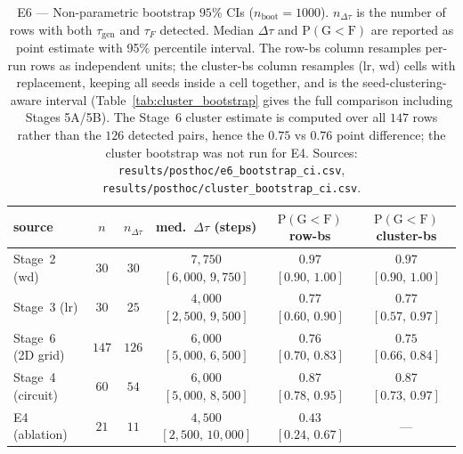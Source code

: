 \documentclass{article}
\newcommand{\taug}{\tau_{\mathrm{gen}}}
\newcommand{\tauf}{\tau_{F}}
\newcommand{\Dtau}{\Delta\tau}
\begin{document}
\begin{table}[tbp]
  \centering
  \caption{E6 --- Non-parametric bootstrap $95\%$ CIs
    ($n_{\mathrm{boot}}{=}1000$).
    $n_{\Dtau}$ is the number of rows with both $\taug$ and
    $\tauf$ detected.
    Median $\Dtau$ and $\mathrm{P}(\mathrm{G}{<}\mathrm{F})$ are
    reported as point estimate with 95\% percentile interval.
    The row-bs column resamples per-run rows as independent units;
    the cluster-bs column resamples (lr, wd) cells with replacement,
    keeping all seeds inside a cell together, and is the
    seed-clustering-aware interval (Table~\ref{tab:cluster_bootstrap}
    gives the full comparison including Stages 5A/5B).
    The Stage~6 cluster estimate is computed over all $147$ rows
    rather than the $126$ detected pairs, hence the $0.75$ vs
    $0.76$ point difference; the cluster bootstrap was not run for
    E4.
    Sources: \texttt{results/posthoc/e6\_bootstrap\_ci.csv},
    \texttt{results/posthoc/cluster\_bootstrap\_ci.csv}.}
  \label{tab:e6_bootstrap}
  \small
  \begin{tabular}{lccccc}
    \toprule
    source & $n$ & $n_{\Dtau}$ & med.\ $\Dtau$ (steps) &
    $\mathrm{P}(\mathrm{G}{<}\mathrm{F})$ row-bs &
    $\mathrm{P}(\mathrm{G}{<}\mathrm{F})$ cluster-bs \\
    \midrule
    Stage~2 (wd)       & $30$  & $30$  & $7{,}750$ $[6{,}000,\,9{,}750]$   & $0.97$ $[0.90,\,1.00]$ & $0.97$ $[0.90,\,1.00]$ \\
    Stage~3 (lr)       & $30$  & $25$  & $4{,}000$ $[2{,}500,\,9{,}500]$   & $0.77$ $[0.60,\,0.90]$ & $0.77$ $[0.57,\,0.97]$ \\
    Stage~6 (2D grid)  & $147$ & $126$ & $6{,}000$ $[5{,}000,\,6{,}500]$   & $0.76$ $[0.70,\,0.83]$ & $0.75$ $[0.66,\,0.84]$ \\
    Stage~4 (circuit)  & $60$  & $54$  & $6{,}000$ $[5{,}000,\,8{,}500]$   & $0.87$ $[0.78,\,0.95]$ & $0.87$ $[0.73,\,0.97]$ \\
    E4 (ablation)      & $21$  & $11$  & $4{,}500$ $[2{,}500,\,10{,}000]$  & $0.43$ $[0.24,\,0.67]$ & --- \\
    \bottomrule
  \end{tabular}
\end{table}
\end{document}
